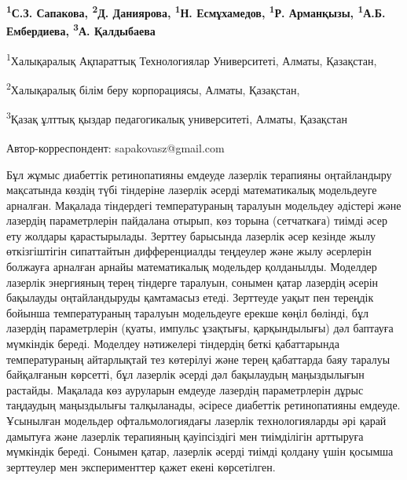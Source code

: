 
\begin{articleheader}

{\bfseries
\textsuperscript{1}С.З. Сапакова\textsuperscript{\envelope },
\textsuperscript{2}Д. Даниярова,
\textsuperscript{1}Н. Есмұхамедов,
\textsuperscript{1}Р. Арманқызы,
\textsuperscript{1}А.Б. Ембердиева,
\textsuperscript{3}А. Қалдыбаева
}
\end{articleheader}

\begin{affiliation}
\textsuperscript{1}Халықаралық Ақпараттық Технологиялар Университеті, Алматы, Қазақстан,

\textsuperscript{2}Халықаралық білім беру корпорациясы, Алматы, Қазақстан,

\textsuperscript{3}Қазақ ұлттық қыздар педагогикалық университеті, Алматы, Қазақстан

\raggedright \textsuperscript{\envelope }Автор-корреспондент: sapakovasz@gmail.com
\end{affiliation}

Бұл жұмыс диабеттік ретинопатияны емдеуде лазерлік терапияны
оңтайландыру мақсатында көздің түбі тіндеріне лазерлік әсерді
математикалық модельдеуге арналған. Мақалада тіндердегі температураның
таралуын модельдеу әдістері және лазердің параметрлерін пайдалана
отырып, көз торына (сетчаткаға) тиімді әсер ету жолдары қарастырылады.
Зерттеу барысында лазерлік әсер кезінде жылу өткізгіштігін сипаттайтын
дифференциалды теңдеулер және жылу әсерлерін болжауға арналған арнайы
математикалық модельдер қолданылды. Моделдер лазерлік энергияның терең
тіндерге таралуын, сонымен қатар лазердің әсерін бақылауды
оңтайландыруды қамтамасыз етеді. Зерттеуде уақыт пен тереңдік бойынша
температураның таралуын модельдеуге ерекше көңіл бөлінді, бұл лазердің
параметрлерін (қуаты, импульс ұзақтығы, қарқындылығы) дәл баптауға
мүмкіндік береді. Моделдеу нәтижелері тіндердің беткі қабаттарында
температураның айтарлықтай тез көтерілуі және терең қабаттарда баяу
таралуы байқалғанын көрсетті, бұл лазерлік әсерді дәл бақылаудың
маңыздылығын растайды. Мақалада көз ауруларын емдеуде лазердің
параметрлерін дұрыс таңдаудың маңыздылығы талқыланады, әсіресе диабеттік
ретинопатияны емдеуде. Ұсынылған модельдер офтальмологиядағы лазерлік
технологияларды әрі қарай дамытуға және лазерлік терапияның қауіпсіздігі
мен тиімділігін арттыруға мүмкіндік береді. Сонымен қатар, лазерлік
әсерді тиімді қолдану үшін қосымша зерттеулер мен эксперименттер қажет
екені көрсетілген.

